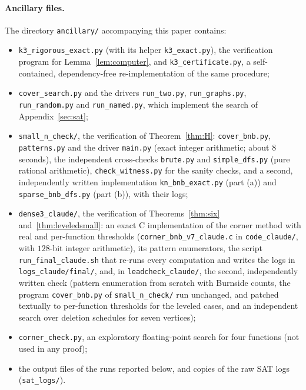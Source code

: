 \documentclass[11pt,letterpaper]{article}
\theoremstyle{definition}
\begin{document}
\paragraph{Ancillary files.}
The directory \texttt{ancillary/} accompanying this paper contains:
\begin{itemize}[itemsep=0pt]
\item \texttt{k3\_rigorous\_exact.py} (with its helper \texttt{k3\_exact.py}), the verification
program for Lemma~\ref{lem:computer}, and \texttt{k3\_certificate.py}, a self-contained,
dependency-free re-implementation of the same procedure;
\item \texttt{cover\_search.py} and the drivers \texttt{run\_two.py}, \texttt{run\_graphs.py},
\texttt{run\_random.py} and \texttt{run\_named.py}, which implement the search of
Appendix~\ref{sec:sat};
\item \texttt{small\_n\_check/}, the verification of Theorem~\ref{thm:H}: \texttt{cover\_bnb.py},
\texttt{patterns.py} and the driver \texttt{main.py} (exact integer arithmetic; about $8$ seconds),
the independent cross-checks \texttt{brute.py} and \texttt{simple\_dfs.py} (pure rational
arithmetic), \texttt{check\_witness.py} for the sanity checks, and a second, independently written
implementation \texttt{kn\_bnb\_exact.py} (part (a)) and \texttt{sparse\_bnb\_dfs.py} (part (b)), with
their logs;
\item \texttt{dense3\_claude/}, the verification of Theorems~\ref{thm:six} and~\ref{thm:leveledsmall}:
an exact C implementation of the corner method with real and per-function thresholds
(\texttt{corner\_bnb\_v7\_claude.c} in \texttt{code\_claude/}, with $128$-bit integer arithmetic), its pattern enumerators,
the script \texttt{run\_final\_claude.sh} that re-runs every computation and writes the logs in
\texttt{logs\_claude/final/}, and, in \texttt{leadcheck\_claude/}, the second, independently written
check (pattern enumeration from scratch with Burnside counts, the program \texttt{cover\_bnb.py} of
\texttt{small\_n\_check/} run unchanged, and patched textually to per-function thresholds for the
leveled cases, and an independent search over deletion schedules for seven vertices);
\item \texttt{corner\_check.py}, an exploratory floating-point search for four functions (not used in any proof);
\item the output files of the runs reported below, and copies of the raw SAT logs
(\texttt{sat\_logs/}).
\end{itemize}
\end{document}
